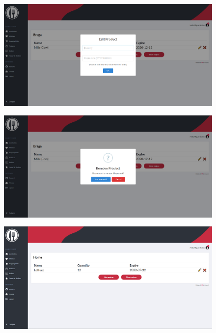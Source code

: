 \documentclass[a4paper]{report}
\begin{document}
    \begin{figure}[H]
        \centering
            \includegraphics[width=\textwidth]{images/produto_final/editar_produto.png}
    \end{figure}

    \begin{figure}[H]
        \centering
            \includegraphics[width=\textwidth]{images/produto_final/eliminar_produto.png}
    \end{figure}

    \begin{figure}[H]
        \centering
            \includegraphics[width=\textwidth]{images/produto_final/pagina_iventario_partilhado.png}
    \end{figure}
\end{document}
